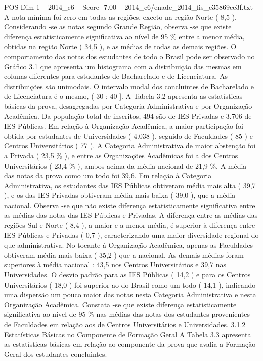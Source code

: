 \begin{textsample}{POS Dim 1 – 2014\_c6 – Score -7.00 – 2014\_c6/enade\_2014\_fis\_e35869ce3f.txt}
A nota mínima foi zero em todas as regiões, exceto na região Norte ( 8,5 ).
Considerando -se as notas segundo Grande Região, observa -se que existe diferença estatisticamente significativa ao nível de 95 \% entre a menor média, obtidas na região Norte ( 34,5 ), e as médias de todas as demais regiões.
O comportamento das notas dos estudantes de todo o Brasil pode ser observado no Gráfico 3.1 que apresenta um histograma com a distribuição das mesmas em colunas diferentes para estudantes de Bacharelado e de Licenciatura.
As distribuições são unimodais.
O intervalo modal dos concluintes de Bacharelado e de Licenciatura é o mesmo, ( 30 ; 40 ].
A Tabela 3.2 apresenta as estatísticas básicas da prova, desagregadas por Categoria Administrativa e por Organização Acadêmica.
Da população total de inscritos, 494 são de IES Privadas e 3.706 de IES Públicas.
Em relação à Organização Acadêmica, a maior participação foi obtida por estudantes de Universidades ( 4.038 ), seguido de Faculdades ( 85 ) e Centros Universitários ( 77 ).
A Categoria Administrativa de maior abstenção foi a Privada ( 23,5 \% ), e entre as Organizações Acadêmicas foi a dos Centros Universitários ( 23,4 \% ), ambos acima da média nacional de 21,9 \%.
A média das notas da prova como um todo foi 39,6.
Em relação à Categoria Administrativa, os estudantes das IES Públicas obtiveram média mais alta ( 39,7 ), e os das IES Privadas obtiveram média mais baixa ( 39,0 ), que a média nacional.
Observa -se que não existe diferença estatisticamente significativa entre as médias das notas das IES Públicas e Privadas.
A diferença entre as médias das regiões Sul e Norte ( 8,4 ), a maior e a menor média, é superior à diferença entre IES Públicas e Privadas ( 0,7 ), caracterizando uma maior diversidade regional do que administrativa.
No tocante à Organização Acadêmica, apenas as Faculdades obtiveram média mais baixa ( 35,2 ) que a nacional.
As demais médias foram superiores à média nacional : 43,5 nos Centros Universitários e 39,7 nas Universidades.
O desvio padrão para as IES Públicas ( 14,2 ) e para os Centros Universitários ( 18,0 ) foi superior ao do Brasil como um todo ( 14,1 ), indicando uma dispersão um pouco maior das notas nesta Categoria Administrativa e nesta Organização Acadêmica.
Constata -se que existe diferença estatisticamente significativa ao nível de 95 \% nas médias das notas dos estudantes provenientes de Faculdades em relação aos de Centros Universitários e Universidades. 3.1.2 Estatísticas Básicas no Componente de Formação Geral A Tabela 3.3 apresenta as estatísticas básicas em relação ao componente da prova que avalia a Formação Geral dos estudantes concluintes.

\end{textsample}
